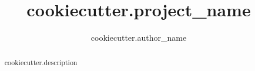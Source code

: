 \documentclass[10pt, oneside]{article}
\title{ {{ cookiecutter.project_name }} }
\author{ {{ cookiecutter.author_name }} }
\begin{document}
\sloppy
\maketitle

\begin{abstract}
    {{ cookiecutter.description }}
\end{abstract}

\tableofcontents
\end{document}
